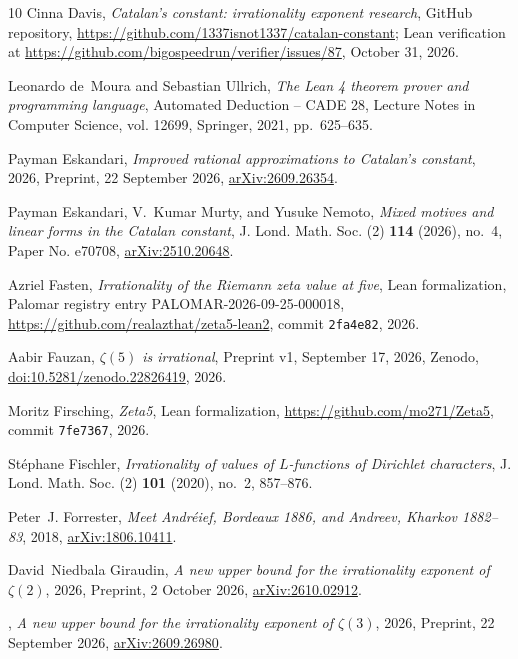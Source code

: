 \documentclass[11pt]{amsart}
\theoremstyle{definition}
\theoremstyle{remark}
\numberwithin{equation}{section}
\begin{document}
\begin{thebibliography}{10}
Cinna Davis, \emph{Catalan's constant: irrationality exponent research}, GitHub
  repository, \url{https://github.com/1337isnot1337/catalan-constant}; Lean
  verification at \url{https://github.com/bigospeedrun/verifier/issues/87},
  October 31, 2026.

Leonardo de~Moura and Sebastian Ullrich, \emph{The {L}ean 4 theorem prover and
  programming language}, Automated Deduction -- CADE 28, Lecture Notes in
  Computer Science, vol. 12699, Springer, 2021, pp.~625--635.

Payman Eskandari, \emph{Improved rational approximations to {C}atalan's
  constant}, 2026, Preprint, 22 September 2026,
  \href{https://arxiv.org/abs/2609.26354}{arXiv:2609.26354}.

Payman Eskandari, V.~Kumar Murty, and Yusuke Nemoto, \emph{Mixed motives and
  linear forms in the {C}atalan constant}, J. Lond. Math. Soc. (2) \textbf{114}
  (2026), no.~4, Paper No. e70708,
  \href{https://arxiv.org/abs/2510.20648}{arXiv:2510.20648}.

Azriel Fasten, \emph{Irrationality of the {R}iemann zeta value at five}, Lean
  formalization, Palomar registry entry PALOMAR-2026-09-25-000018,
  \url{https://github.com/realazthat/zeta5-lean2}, commit \texttt{2fa4e82},
  2026.

Aabir Fauzan, \emph{{$\zeta(5)$} is irrational}, Preprint v1, September 17,
  2026, Zenodo,
  \href{https://doi.org/10.5281/zenodo.22826419}{doi:10.5281/zenodo.22826419},
  2026.

Moritz Firsching, \emph{Zeta5}, Lean formalization,
  \url{https://github.com/mo271/Zeta5}, commit \texttt{7fe7367}, 2026.

St\'ephane Fischler, \emph{Irrationality of values of {$L$}-functions of
  {D}irichlet characters}, J. Lond. Math. Soc. (2) \textbf{101} (2020), no.~2,
  857--876.

Peter~J. Forrester, \emph{Meet {A}ndr\'eief, {B}ordeaux 1886, and {A}ndreev,
  {K}harkov 1882--83}, 2018,
  \href{https://arxiv.org/abs/1806.10411}{arXiv:1806.10411}.

David~Niedbala Giraudin, \emph{A new upper bound for the irrationality exponent
  of {$\zeta(2)$}}, 2026, Preprint, 2 October 2026,
  \href{https://arxiv.org/abs/2610.02912}{arXiv:2610.02912}.

\bysame, \emph{A new upper bound for the irrationality exponent of
  {$\zeta(3)$}}, 2026, Preprint, 22 September 2026,
  \href{https://arxiv.org/abs/2609.26980}{arXiv:2609.26980}.


\end{thebibliography}
\end{document}
